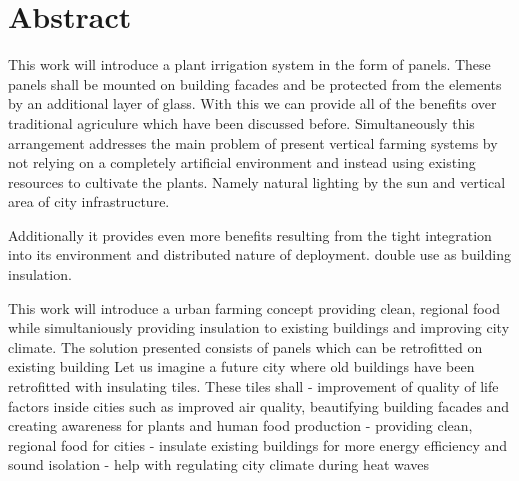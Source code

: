 \chapter{Abstract}
%
This work will introduce a plant irrigation system in the form of panels.
These panels shall be mounted on building facades and be protected from the elements by an additional layer of glass.
With this we can provide all of the benefits over traditional agriculure which have been discussed before.
Simultaneously this arrangement addresses the main problem of present vertical farming systems by not relying on a completely artificial environment and instead using existing resources to cultivate the plants.
Namely natural lighting by the sun and vertical area of city infrastructure.

Additionally it provides even more benefits resulting from the tight integration into its environment and distributed nature of deployment.
double use as building insulation.

This work will introduce a urban farming concept providing clean, regional food while simultaniously providing insulation to existing buildings and improving city climate.
The solution presented consists of panels which can be retrofitted on existing building
Let us imagine a future city where old buildings have been retrofitted with insulating tiles. These tiles shall 
- improvement of quality of life factors inside cities such as improved air quality, beautifying building facades and creating awareness for plants and human food production
- providing clean, regional food for cities
- insulate existing buildings for more energy efficiency and sound isolation
- help with regulating city climate during heat waves

